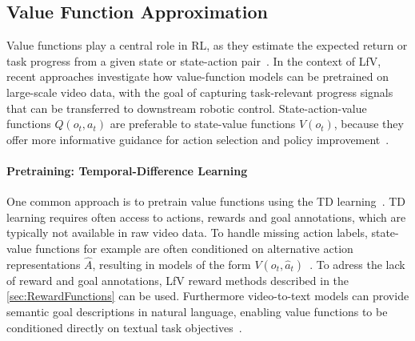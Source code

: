 \subsection{Value Function Approximation}
\label{sec:ValueFunctions}


Value functions play a central role in \ac{RL}, as they estimate the expected return or task progress from a given state or state-action pair~\cite{Schulman2017ProximalPO, Haarnoja2018SoftAA}. In the context of \ac{LfV}, recent approaches investigate how value-function models can be pretrained on large-scale video data, with the goal of capturing task-relevant progress signals that can be transferred to downstream robotic control. State-action-value functions $Q(o_t, a_t)$ are preferable to state-value functions $V(o_t)$, because they offer more informative guidance for action selection and policy improvement~\cite{sutton2018reinforcement}.


\paragraph{Pretraining: Temporal-Difference Learning}
One common approach is to pretrain value functions using the \ac{TD} learning~\cite{sutton2018reinforcement}. \ac{TD} learning requires often access to actions, rewards and goal annotations, which are typically not available in raw video data. 
To handle missing action labels, state-value functions for example are often conditioned on alternative action representations $\hat{A}$, resulting in models of the form $V(o_t, \hat{a}_t)$~\cite{McCarthy_2025}. 
To adress the lack of reward and goal annotations, \ac{LfV} reward methods described in the \autoref{sec:RewardFunctions} can be used. Furthermore video-to-text models can provide semantic goal descriptions in natural language, enabling value functions to be conditioned directly on textual task objectives~\cite{McCarthy_2025}.




